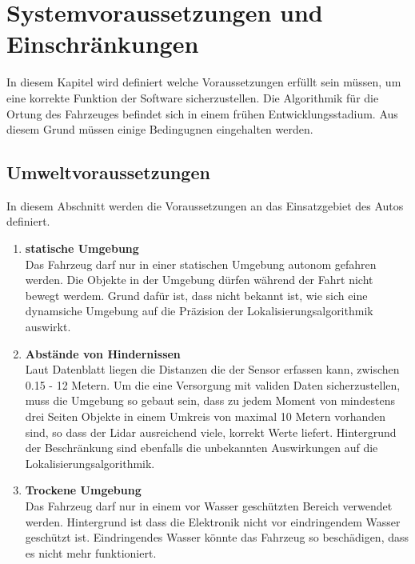 \section{Systemvoraussetzungen und Ein\-schränkungen}
In diesem Kapitel wird definiert welche Voraussetzungen erfüllt sein müssen, um eine korrekte Funktion der Software sicherzustellen.
Die Algorithmik für die Ortung des Fahrzeuges befindet sich in einem frühen Entwicklungsstadium. 
Aus diesem Grund müssen einige Bedingugnen eingehalten werden. 
\subsection{Umweltvoraussetzungen}
In diesem Abschnitt werden die Voraussetzungen an das Einsatzgebiet des Autos definiert.
\begin{enumerate}[leftmargin=*]
    \item \textbf{statische Umgebung} \\
    Das Fahrzeug darf nur in einer statischen Umgebung autonom gefahren werden. 
    Die Objekte in der Umgebung dürfen während der Fahrt nicht bewegt werdem.
    Grund dafür ist, dass nicht bekannt ist, wie sich eine dynamsiche Umgebung auf die Präzision der Lokalisierungsalgorithmik auswirkt. 
    \item \textbf{Abstände von Hindernissen}\\
    Laut Datenblatt \cite{Slamtec2020} liegen die Distanzen die der Sensor erfassen kann, zwischen 0.15 - 12 Metern.
    Um die eine Versorgung mit validen Daten sicherzustellen, 
    muss die Umgebung so gebaut sein, 
    dass zu jedem Moment von mindestens drei Seiten Objekte in einem Umkreis von maximal 10 Metern vorhanden sind,
    so dass der Lidar ausreichend viele, korrekt Werte liefert.  
    Hintergrund der Beschränkung sind ebenfalls die unbekannten Auswirkungen auf die Lokalisierungsalgorithmik.
    \item \textbf{Trockene Umgebung}\\
    Das Fahrzeug darf nur in einem vor Wasser geschützten Bereich verwendet werden.
    Hintergrund ist dass die Elektronik nicht vor eindringendem Wasser geschützt ist.
    Eindringendes Wasser könnte das Fahrzeug so beschädigen, dass es nicht mehr funktioniert.
\end{enumerate}



